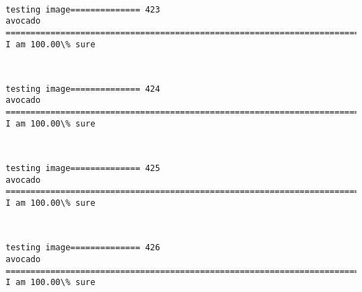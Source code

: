 \documentclass[11pt]{article}
\begin{document}
    \begin{center}
    \end{center}
    { \hspace*{\fill} \\}
    
    \begin{Verbatim}[commandchars=\\\{\}]
testing image============== 423
avocado
============================================================================
I am 100.00\% sure

    \end{Verbatim}

    \begin{center}
    \end{center}
    { \hspace*{\fill} \\}
    
    \begin{Verbatim}[commandchars=\\\{\}]
testing image============== 424
avocado
============================================================================
I am 100.00\% sure

    \end{Verbatim}

    \begin{center}
    \end{center}
    { \hspace*{\fill} \\}
    
    \begin{Verbatim}[commandchars=\\\{\}]
testing image============== 425
avocado
============================================================================
I am 100.00\% sure

    \end{Verbatim}

    \begin{center}
    \end{center}
    { \hspace*{\fill} \\}
    
    \begin{Verbatim}[commandchars=\\\{\}]
testing image============== 426
avocado
============================================================================
I am 100.00\% sure

    \end{Verbatim}
\end{document}
